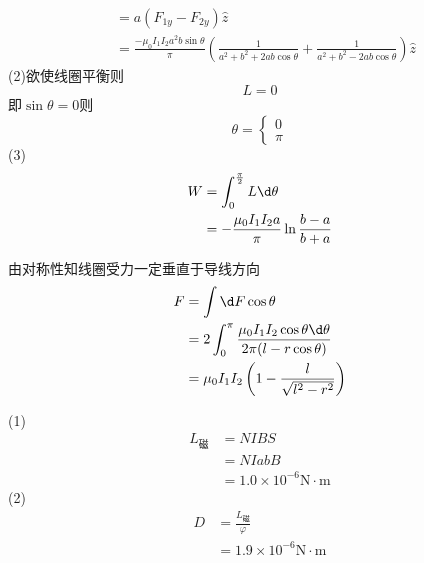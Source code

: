 \documentclass{phyasgn}
\begin{document}
\begin{sol}[2-32]
$$\begin{aligned}
    &=a(F_{1y}-F_{2y})\hat{z}\\
    &=\frac{-\mu_0I_1I_2a^2b\sin\theta}{\pi}\left ( \frac{1}{a^2+b^2+2ab\cos\theta}+\frac{1}{a^2+b^2-2ab\cos\theta}\right )\hat{z}
  \end{aligned}$$
  (2)欲使线圈平衡则$$L=0$$
  即$\sin\theta=0$则
  $$\theta=\left\{\begin{matrix}
    0\\
   \pi
   \end{matrix}\right.$$
   (3)$$\begin{aligned}
    W&=\int_0^{\frac{\pi}{2}} L\d \theta\\
    &=-\frac{\mu_0I_1I_2a}{\pi}\ln\frac{b-a}{b+a}
   \end{aligned}$$
\end{sol}\par

\begin{sol}[2-33]
  由对称性知线圈受力一定垂直于导线方向
  $$\begin{aligned}
    F&=\int \d F\cos\theta\\
    &=2\int_0^\pi\frac{\mu_0I_1I_2\cos\theta\d \theta}{2\pi(l-r\cos\theta)}\\
    &=\mu_0I_1I_2\left ( 1-\frac{l}{\sqrt{l^2-r^2}}\right )
  \end{aligned}$$
\end{sol}\par

\begin{sol}[2-35]
  (1)$$\begin{aligned}
    L_\text{磁}&=NIBS\\
    &=NIabB\\
    &=1.0\times 10^{-6}\text{N}\cdot \text{m}
  \end{aligned}$$
  (2)$$\begin{aligned}
    D&=\frac{L_\text{磁}}{\varphi}\\
    &=1.9\times 10^{-6}\text{N}\cdot \text{m}
  \end{aligned}$$
\end{sol}\par
\end{document}
